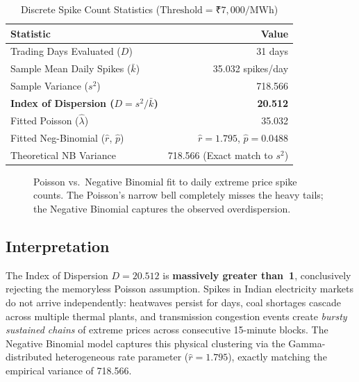 \documentclass[12pt, a4paper]{article}
\theoremstyle{definition}
\newcommand{\MWh}{\text{MWh}}
\begin{document}
\begin{table}[H]
\centering
\caption{Discrete Spike Count Statistics ($\text{Threshold} = \text{₹}7{,}000/\MWh$)}
\label{tab:spike_stats}
\begin{tabular}{l r}
\toprule
\textbf{Statistic} & \textbf{Value} \\
\midrule
Trading Days Evaluated ($D$) & 31 days \\
Sample Mean Daily Spikes ($\bar{k}$) & 35.032 spikes/day \\
Sample Variance ($s^2$) & 718.566 \\
\textbf{Index of Dispersion ($D = s^2/\bar{k}$)} & \textbf{20.512} \\
\midrule
Fitted Poisson ($\hat{\lambda}$) & 35.032 \\
Fitted Neg-Binomial ($\hat{r}$, $\hat{p}$) & $\hat{r} = 1.795$, $\hat{p} = 0.0488$ \\
Theoretical NB Variance & 718.566 (Exact match to $s^2$) \\
\bottomrule
\end{tabular}
\end{table}

\begin{figure}[H]
    \centering
    \caption{Poisson vs.\ Negative Binomial fit to daily extreme price spike counts. The Poisson's narrow bell completely misses the heavy tails; the Negative Binomial captures the observed overdispersion.}
    \label{fig:spikes}
\end{figure}

\subsection{Interpretation}

The Index of Dispersion $D = 20.512$ is \textbf{massively greater than~1}, conclusively rejecting the memoryless Poisson assumption. Spikes in Indian electricity markets do not arrive independently: heatwaves persist for days, coal shortages cascade across multiple thermal plants, and transmission congestion events create \emph{bursty sustained chains} of extreme prices across consecutive 15-minute blocks. The Negative Binomial model captures this physical clustering via the Gamma-distributed heterogeneous rate parameter ($\hat{r} = 1.795$), exactly matching the empirical variance of 718.566.
\end{document}
